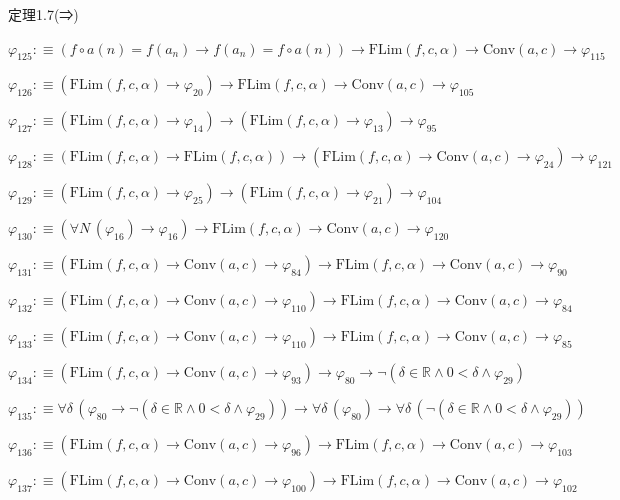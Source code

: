 \begin{fullproof}{定理1.7(⇒)}
\begin{abbrevlist}
\item $\varphi_{125} :\equiv (f \circ a(n) = f(a_{n}) \to f(a_{n}) = f \circ a(n)) \to \mathrm{FLim}(f,c,\alpha) \to \mathrm{Conv}(a,c) \to \varphi_{115}$
\item $\varphi_{126} :\equiv (\mathrm{FLim}(f,c,\alpha) \to \varphi_{20}) \to \mathrm{FLim}(f,c,\alpha) \to \mathrm{Conv}(a,c) \to \varphi_{105}$
\item $\varphi_{127} :\equiv (\mathrm{FLim}(f,c,\alpha) \to \varphi_{14}) \to (\mathrm{FLim}(f,c,\alpha) \to \varphi_{13}) \to \varphi_{95}$
\item $\varphi_{128} :\equiv (\mathrm{FLim}(f,c,\alpha) \to \mathrm{FLim}(f,c,\alpha)) \to (\mathrm{FLim}(f,c,\alpha) \to \mathrm{Conv}(a,c) \to \varphi_{24}) \to \varphi_{121}$
\item $\varphi_{129} :\equiv (\mathrm{FLim}(f,c,\alpha) \to \varphi_{25}) \to (\mathrm{FLim}(f,c,\alpha) \to \varphi_{21}) \to \varphi_{104}$
\item $\varphi_{130} :\equiv (\forall N\,(\varphi_{16}) \to \varphi_{16}) \to \mathrm{FLim}(f,c,\alpha) \to \mathrm{Conv}(a,c) \to \varphi_{120}$
\item $\varphi_{131} :\equiv (\mathrm{FLim}(f,c,\alpha) \to \mathrm{Conv}(a,c) \to \varphi_{84}) \to \mathrm{FLim}(f,c,\alpha) \to \mathrm{Conv}(a,c) \to \varphi_{90}$
\item $\varphi_{132} :\equiv (\mathrm{FLim}(f,c,\alpha) \to \mathrm{Conv}(a,c) \to \varphi_{110}) \to \mathrm{FLim}(f,c,\alpha) \to \mathrm{Conv}(a,c) \to \varphi_{84}$
\item $\varphi_{133} :\equiv (\mathrm{FLim}(f,c,\alpha) \to \mathrm{Conv}(a,c) \to \varphi_{110}) \to \mathrm{FLim}(f,c,\alpha) \to \mathrm{Conv}(a,c) \to \varphi_{85}$
\item $\varphi_{134} :\equiv (\mathrm{FLim}(f,c,\alpha) \to \mathrm{Conv}(a,c) \to \varphi_{93}) \to \varphi_{80} \to \neg (\delta \in \mathbb{R} \land 0 < \delta \land \varphi_{29})$
\item $\varphi_{135} :\equiv \forall \delta\,(\varphi_{80} \to \neg (\delta \in \mathbb{R} \land 0 < \delta \land \varphi_{29})) \to \forall \delta\,(\varphi_{80}) \to \forall \delta\,(\neg (\delta \in \mathbb{R} \land 0 < \delta \land \varphi_{29}))$
\item $\varphi_{136} :\equiv (\mathrm{FLim}(f,c,\alpha) \to \mathrm{Conv}(a,c) \to \varphi_{96}) \to \mathrm{FLim}(f,c,\alpha) \to \mathrm{Conv}(a,c) \to \varphi_{103}$
\item $\varphi_{137} :\equiv (\mathrm{FLim}(f,c,\alpha) \to \mathrm{Conv}(a,c) \to \varphi_{100}) \to \mathrm{FLim}(f,c,\alpha) \to \mathrm{Conv}(a,c) \to \varphi_{102}$

\end{abbrevlist}
\end{fullproof}
